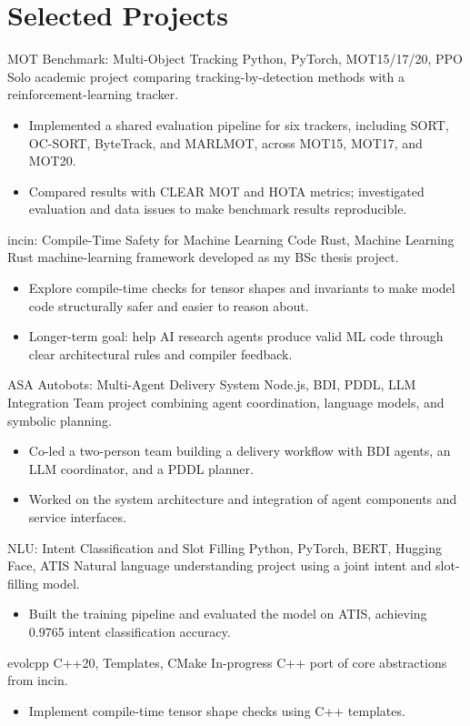 \section{Selected Projects}

\cvproject
  {MOT Benchmark: Multi-Object Tracking}
  {Python, PyTorch, MOT15/17/20, PPO}
  {Solo academic project comparing tracking-by-detection methods with a reinforcement-learning tracker.}
  {
    \begin{itemize}
      \item Implemented a shared evaluation pipeline for six trackers, including SORT, OC-SORT, ByteTrack, and MARLMOT, across MOT15, MOT17, and MOT20.
      \item Compared results with CLEAR MOT and HOTA metrics; investigated evaluation and data issues to make benchmark results reproducible.
    \end{itemize}
  }

\cvproject
  {incin: Compile-Time Safety for Machine Learning Code}
  {Rust, Machine Learning}
  {Rust machine-learning framework developed as my BSc thesis project.}
  {
    \begin{itemize}
      \item Explore compile-time checks for tensor shapes and invariants to make model code structurally safer and easier to reason about.
      \item Longer-term goal: help AI research agents produce valid ML code through clear architectural rules and compiler feedback.
    \end{itemize}
  }

\cvproject
  {ASA Autobots: Multi-Agent Delivery System}
  {Node.js, BDI, PDDL, LLM Integration}
  {Team project combining agent coordination, language models, and symbolic planning.}
  {
    \begin{itemize}
      \item Co-led a two-person team building a delivery workflow with BDI agents, an LLM coordinator, and a PDDL planner.
      \item Worked on the system architecture and integration of agent components and service interfaces.
    \end{itemize}
  }

\cvproject
  {NLU: Intent Classification and Slot Filling}
  {Python, PyTorch, BERT, Hugging Face, ATIS}
  {Natural language understanding project using a joint intent and slot-filling model.}
  {
    \begin{itemize}
      \item Built the training pipeline and evaluated the model on ATIS, achieving 0.9765 intent classification accuracy.
    \end{itemize}
  }

\cvproject
  {evolcpp}
  {C++20, Templates, CMake}
  {In-progress C++ port of core abstractions from incin.}
  {
    \begin{itemize}
      \item Implement compile-time tensor shape checks using C++ templates.
    \end{itemize}
  }
